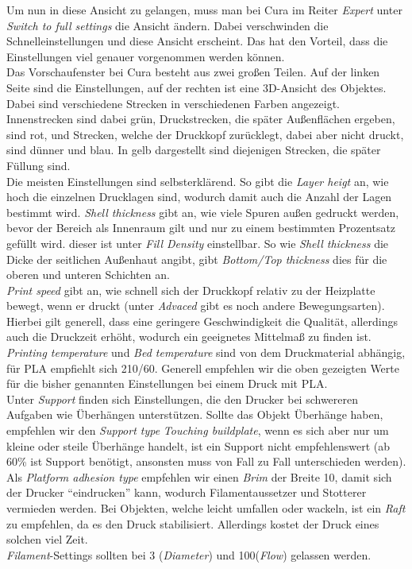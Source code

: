 \documentclass[11pt,a4paper]{scrartcl}
\begin{document}
Um nun in diese Ansicht zu gelangen, muss man bei Cura im Reiter \textit{Expert} unter \textit{Switch to full settings} die Ansicht ändern. Dabei verschwinden die Schnelleinstellungen und diese Ansicht erscheint. Das hat den Vorteil, dass die Einstellungen viel genauer vorgenommen werden können.\\
Das Vorschaufenster bei Cura besteht aus zwei großen Teilen. Auf der linken Seite sind die Einstellungen, auf der rechten ist eine 3D-Ansicht des Objektes. Dabei sind verschiedene Strecken in verschiedenen Farben angezeigt. Innenstrecken sind dabei grün, Druckstrecken, die später Außenflächen ergeben, sind rot, und Strecken, welche der Druckkopf zurücklegt, dabei aber nicht druckt, sind dünner und blau. In gelb dargestellt sind diejenigen Strecken, die später Füllung sind.\\
Die meisten Einstellungen sind selbsterklärend. So gibt die \textit{Layer heigt} an, wie hoch die einzelnen Drucklagen sind, wodurch damit auch die Anzahl der Lagen bestimmt wird. \textit{Shell thickness} gibt an, wie viele Spuren außen gedruckt werden, bevor der Bereich als Innenraum gilt und nur zu einem bestimmten Prozentsatz gefüllt wird. dieser ist unter \textit{Fill Density} einstellbar. So wie \textit{Shell thickness} die Dicke der seitlichen Außenhaut angibt, gibt \textit{Bottom/Top thickness} dies für die oberen und unteren Schichten an.\\
\textit{Print speed} gibt an, wie schnell sich der Druckkopf relativ zu der Heizplatte bewegt, wenn er druckt (unter \textit{Advaced} gibt es noch andere Bewegungsarten). Hierbei gilt generell, dass eine geringere Geschwindigkeit die Qualität, allerdings auch die Druckzeit erhöht, wodurch ein geeignetes Mittelmaß zu finden ist. \textit{Printing temperature} und \textit{Bed temperature} sind von dem Druckmaterial abhängig, für PLA empfiehlt sich 210/60. Generell empfehlen wir die oben gezeigten Werte für die bisher genannten Einstellungen bei einem Druck mit PLA.\\
Unter \textit{Support} finden sich Einstellungen, die den Drucker bei schwereren Aufgaben wie Überhängen unterstützen. Sollte das Objekt Überhänge haben, empfehlen wir den \textit{Support type} \textit{Touching buildplate}, wenn es sich aber nur um kleine oder steile Überhänge handelt, ist ein Support nicht empfehlenswert (ab 60\% ist Support benötigt, ansonsten muss von Fall zu Fall unterschieden werden). Als \textit{Platform adhesion type} empfehlen wir einen \textit{Brim} der Breite 10, damit sich der Drucker \enquote{eindrucken} kann, wodurch Filamentaussetzer und Stotterer vermieden werden. Bei Objekten, welche leicht umfallen oder wackeln, ist ein \textit{Raft} zu empfehlen, da es den Druck stabilisiert. Allerdings kostet der Druck eines solchen viel Zeit.\\
\textit{Filament}-Settings sollten bei 3 (\textit{Diameter}) und 100(\textit{Flow}) gelassen werden.
\pagebreak
\end{document}
